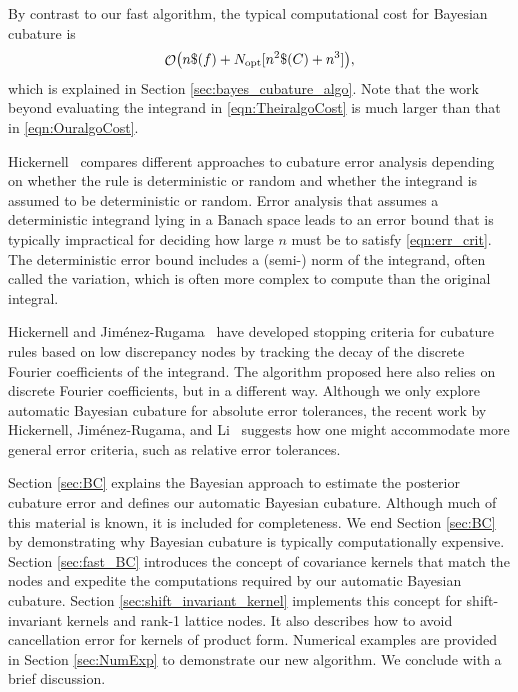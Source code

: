 \documentclass[twocolumn]{svjour3}          %
\DeclareMathOperator{\Order}{{\mathcal O}}
\begin{document}
By contrast to our fast algorithm, the typical computational cost for Bayesian cubature is
\begin{equation} \label{eqn:TheiralgoCost}
    \Order\bigl(n \$(f) + N_{\textup{opt}}[n^2\$(C) + n^3] \bigr),
\end{equation} 
which is explained in Section \ref{sec:bayes_cubature_algo}. Note that the work beyond evaluating the integrand in \eqref{eqn:TheiralgoCost} is much larger than that in \eqref{eqn:OuralgoCost}.  

Hickernell~\cite{Hic17a} compares different approaches to cubature error analysis depending on whether the rule is deterministic or random and whether the integrand is assumed to be deterministic or random.  Error analysis that assumes a deterministic integrand lying in a Banach space leads to an error bound that is typically impractical for deciding how large $n$ must be to satisfy \eqref{eqn:err_crit}.  The deterministic error bound includes a (semi-) norm of the integrand, often called the variation, which is often more complex to compute than the original integral.

Hickernell and Jim\'enez-Rugama~\cite{HicJim16a,JimHic16a} have developed stopping criteria for cubature rules based on low discrepancy nodes by tracking the decay of the discrete Fourier coefficients of the integrand.  The algorithm proposed here also relies on discrete Fourier coefficients, but in a different way.  Although we only explore automatic Bayesian cubature for absolute error tolerances, the recent work by Hickernell, Jim\'enez-Rugama, and Li~\cite{HicEtal17a} suggests how one might accommodate more general error criteria, such as relative error tolerances.

Section \ref{sec:BC} explains the Bayesian approach to estimate the posterior cubature error and defines our automatic Bayesian cubature. Although much of this material is known, it is included for completeness.  We end Section \ref{sec:BC}  by demonstrating why Bayesian cubature is typically computationally expensive.
Section \ref{sec:fast_BC}  introduces the concept of covariance kernels that match the nodes and expedite the computations required by our automatic Bayesian cubature. 
Section \ref{sec:shift_invariant_kernel} implements this concept for shift-invariant kernels and rank-1 lattice nodes.  It also describes how to avoid cancellation error for kernels of product form.  Numerical examples are provided in Section \ref{sec:NumExp} to demonstrate our new algorithm.  We conclude with a brief discussion.
\end{document}
